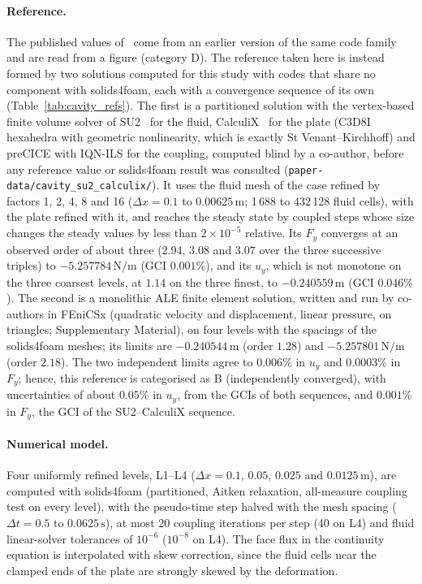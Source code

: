 \paragraph{Reference.}
The published values of~\citet{Tukovic2018} come from an earlier version of the same code family and are read from a figure (category D).
The reference taken here is instead formed by two solutions computed for this study with codes that share no component with solids4foam, each with a convergence sequence of its own (Table~\ref{tab:cavity_refs}).
The first is a partitioned solution with the vertex-based finite volume solver of SU2~\citep{Economon2016,Economon2020} for the fluid, CalculiX~\citep{Dhondt2004} for the plate (C3D8I hexahedra with geometric nonlinearity, which is exactly St Venant--Kirchhoff) and preCICE with IQN-ILS for the coupling, computed blind by a co-author, before any reference value or solids4foam result was consulted (\texttt{paper-data/cavity\_su2\_calculix/}).
It uses the fluid mesh of the case refined by factors 1, 2, 4, 8 and 16 ($\Delta x = 0.1$ to $0.00625\,\mathrm{m}$; 1\,688 to 432\,128 fluid cells), with the plate refined with it, and reaches the steady state by coupled steps whose size changes the steady values by less than $2\times10^{-5}$ relative.
Its $F_y$ converges at an observed order of about three ($2.94$, $3.08$ and $3.07$ over the three successive triples) to $-5.257784\,\mathrm{N/m}$ (GCI $0.001\%$), and its $u_y$, which is not monotone on the three coarsest levels, at $1.14$ on the three finest, to $-0.240559\,\mathrm{m}$ (GCI $0.046\%$).
The second is a monolithic ALE finite element solution, written and run by co-authors in FEniCSx (quadratic velocity and displacement, linear pressure, on triangles; Supplementary Material), on four levels with the spacings of the solids4foam meshes; its limits are $-0.240544\,\mathrm{m}$ (order $1.28$) and $-5.257801\,\mathrm{N/m}$ (order $2.18$).
The two independent limits agree to $0.006\%$ in $u_y$ and $0.0003\%$ in $F_y$; hence, this reference is categorised as B (independently converged), with uncertainties of about $0.05\%$ in $u_y$, from the GCIs of both sequences, and $0.001\%$ in $F_y$, the GCI of the SU2--CalculiX sequence.

\paragraph{Numerical model.}
Four uniformly refined levels, L1--L4 ($\Delta x = 0.1$, $0.05$, $0.025$ and $0.0125\,\mathrm{m}$), are computed with solids4foam (partitioned, Aitken relaxation, all-measure coupling test on every level), with the pseudo-time step halved with the mesh spacing ($\Delta t = 0.5$ to $0.0625\,\mathrm{s}$), at most 20 coupling iterations per step (40 on L4) and fluid linear-solver tolerances of $10^{-6}$ ($10^{-8}$ on L4).
The face flux in the continuity equation is interpolated with skew correction, since the fluid cells near the clamped ends of the plate are strongly skewed by the deformation.

